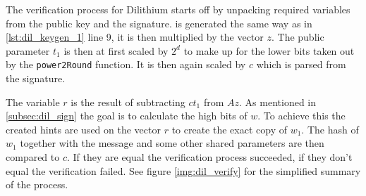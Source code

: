The verification process for Dilithium starts off by unpacking required variables from the public key and the signature.  is generated the same way as in \ref{lst:dil_keygen_1} line 9, it is then multiplied by the vector $z$. The public parameter $t_1$ is then at first scaled by $2^d$ to make up for the lower bits taken out by the \texttt{power2Round} function. It is then again scaled by $c$ which is parsed from the signature.

The variable $r$ is the result of subtracting $ct_1$ from $Az$. As mentioned in \ref{subsec:dil_sign} the goal is to calculate the high bits of $w$. To achieve this the created hints are used on the vector $r$ to create the exact copy of $w_1$. The hash of $w_1$ together with the message and some other shared parameters are then compared to $c$. If they are equal the verification process succeeded, if they don't equal the verification failed. See figure \ref{img:dil_verify} for the simplified summary of the process.
\newpage
{}

